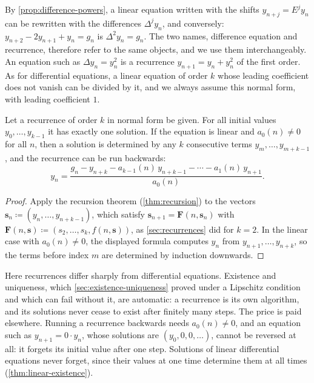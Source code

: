 By \cref{prop:difference-powers}, a linear equation written with the shifts $y_{n+j}=E^jy_n$ can be rewritten with the differences $\Delta^jy_n$, and conversely: $y_{n+2}-2y_{n+1}+y_n=g_n$ is $\Delta^2y_n=g_n$. The two names, difference equation and recurrence, therefore refer to the same objects, and we use them interchangeably. An equation such as $\Delta y_n=y_n^2$ is a recurrence $y_{n+1}=y_n+y_n^2$ of the first order. As for differential equations, a linear equation of order $k$ whose leading coefficient does not vanish can be divided by it, and we always assume this normal form, with leading coefficient $1$.

\begin{proposition}
\label{prop:recurrence-ivp}
Let a recurrence of order $k$ in normal form be given. For all initial values $y_0,\ldots,y_{k-1}$ it has exactly one solution. If the equation is linear and $a_0(n)\ne0$ for all $n$, then a solution is determined by any $k$ consecutive terms $y_m,\ldots,y_{m+k-1}$, and the recurrence can be run backwards:
\[
y_n=\frac{g_n-y_{n+k}-a_{k-1}(n)\,y_{n+k-1}-\cdots-a_1(n)\,y_{n+1}}{a_0(n)} .
\]
\end{proposition}

\begin{proof}
Apply the recursion theorem (\cref{thm:recursion}) to the vectors $\mathbf s_n\coloneqq(y_n,\ldots,y_{n+k-1})$, which satisfy $\mathbf s_{n+1}=\mathbf F(n,\mathbf s_n)$ with $\mathbf F(n,\mathbf s)\coloneqq(s_2,\ldots,s_k,f(n,\mathbf s))$, as \cref{sec:recurrences} did for $k=2$. In the linear case with $a_0(n)\ne0$, the displayed formula computes $y_n$ from $y_{n+1},\ldots,y_{n+k}$, so the terms before index $m$ are determined by induction downwards.
\end{proof}

Here recurrences differ sharply from differential equations. Existence and uniqueness, which \cref{sec:existence-uniqueness} proved under a Lipschitz condition and which can fail without it, are automatic: a recurrence is its own algorithm, and its solutions never cease to exist after finitely many steps. The price is paid elsewhere. Running a recurrence backwards needs $a_0(n)\ne0$, and an equation such as $y_{n+1}=0\cdot y_n$, whose solutions are $(y_0,0,0,\ldots)$, cannot be reversed at all: it forgets its initial value after one step. Solutions of linear differential equations never forget, since their values at one time determine them at all times (\cref{thm:linear-existence}).

